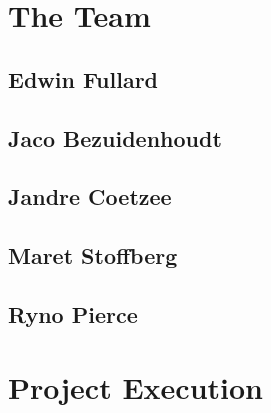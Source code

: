 \documentclass[a4paper,12pt,titlepage]{article}
\begin{document}
	
	
	\newpage
	\tableofcontents
	\newpage
	
	\section{The Team}
	
		\subsection{Edwin Fullard}
		
		\newpage
		
		\subsection{Jaco Bezuidenhoudt}
		
		\newpage
		
		\subsection{Jandre Coetzee}
		
		\newpage
		
		\subsection{Maret Stoffberg}
		
		\newpage
		
		\subsection{Ryno Pierce}
		
		\newpage
		
	\section{Project Execution}
	
\end{document}
